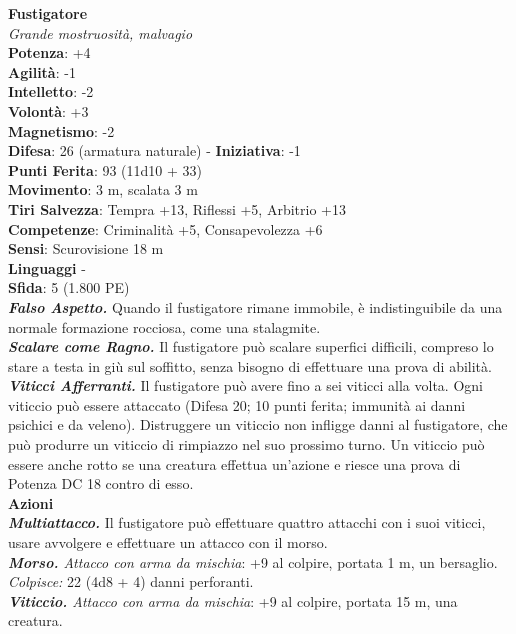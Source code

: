 \begin{multicols}{2}
\medskip\textbf{Fustigatore}\\
\emph{Grande mostruosità, malvagio}\\
\textbf{Potenza}: +4\\
\textbf{Agilità}: -1\\
\textbf{Intelletto}: -2\\
\textbf{Volontà}: +3\\
\textbf{Magnetismo}: -2\\
\textbf{Difesa}: 26 (armatura naturale) - \textbf{Iniziativa}: -1\\
\textbf{Punti Ferita}: 93 (11d10 + 33)\\
\textbf{Movimento}: 3 m, scalata 3 m\\
\textbf{Tiri Salvezza}: Tempra +13, Riflessi +5, Arbitrio +13\\
\textbf{Competenze}: Criminalità +5, Consapevolezza +6\\
\textbf{Sensi}: Scurovisione 18 m\\
\textbf{Linguaggi} -\\
\textbf{Sfida}: 5 (1.800 PE)\smallskip\\
\emph{\textbf{Falso Aspetto.}} Quando il fustigatore rimane immobile, è indistinguibile da una normale formazione rocciosa, come una stalagmite.\\
\emph{\textbf{Scalare come Ragno.}} Il fustigatore può scalare superfici difficili, compreso lo stare a testa in giù sul soffitto, senza bisogno di effettuare una prova di abilità.\\
\emph{\textbf{Viticci Afferranti.}} Il fustigatore può avere fino a sei viticci alla volta. Ogni viticcio può essere attaccato (Difesa 20; 10 punti ferita; immunità ai danni psichici e da veleno). Distruggere un viticcio non infligge danni al fustigatore, che può produrre un viticcio di rimpiazzo nel suo prossimo turno. Un viticcio può essere anche rotto se una creatura effettua un'azione e riesce una prova di Potenza DC  18 contro di esso.\\
\smallskip\textbf{Azioni}\\
\emph{\textbf{Multiattacco.}} Il fustigatore può effettuare quattro attacchi con i suoi viticci, usare avvolgere e effettuare un attacco con il morso.\\
\emph{\textbf{Morso.} Attacco con arma da mischia}: +9 al colpire, portata 1 m, un bersaglio.\\
\emph{Colpisce:} 22 (4d8 + 4) danni perforanti.\\
\emph{\textbf{Viticcio.} Attacco con arma da mischia}: +9 al colpire, portata 15 m, una creatura.\\

\end{multicols}
